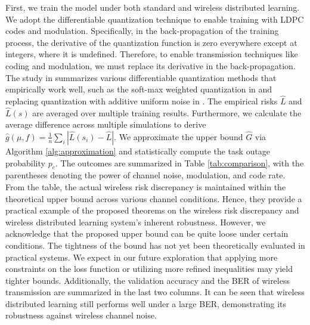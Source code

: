 \documentclass[lettersize,journal]{IEEEtran}
\theoremstyle{definition}
\theoremstyle{plain}
\begin{document}
First, we train the model under both standard and wireless distributed learning. We adopt the differentiable quantization technique to enable training with LDPC codes and modulation.
Specifically, in the back-propagation of the training process, the derivative of the quantization function is zero everywhere except at integers, where it is undefined. Therefore, to enable transmission techniques like coding and modulation, we must replace its derivative in the back-propagation. The study in \cite{differentiable-quantize} summarizes various differentiable quantization methods that empirically work well, such as the soft-max weighted quantization in \cite{soft-quantize} and replacing quantization with additive uniform noise in \cite{uniform-noise-quantize}.
The empirical risks $\hat{L}$ and $\hat{L}(s)$ are averaged over multiple training results. Furthermore, we calculate the average difference across multiple simulations to derive $\hat{g}(\mu,f)=\frac{1}{n}\sum_i|\hat{L}(s_i)-\hat{L}|$. 
We approximate the upper bound $\hat{G}$ via Algorithm \ref{alg:approximation} and statistically compute the task outage probability $p_e$.
The outcomes are summarized in Table \ref{tab:comparison}, with the parentheses denoting the power of channel noise, modulation, and code rate.
From the table, the actual wireless risk discrepancy is maintained within the theoretical upper bound across various channel conditions. Hence, they provide a practical example of the proposed theorems on the wireless risk discrepancy and wireless distributed learning system's inherent robustness. 
However, we acknowledge that the proposed upper bound can be quite loose under certain conditions. The tightness of the bound has not yet been theoretically evaluated in practical systems. We expect in our future exploration that applying more constraints on the loss function or utilizing more refined inequalities may yield tighter bounds.
Additionally, the validation accuracy and the BER of wireless transmission are summarized in the last two columns. It can be seen that wireless distributed learning still performs well under a large BER, demonstrating its robustness against wireless channel noise.
\end{document}
